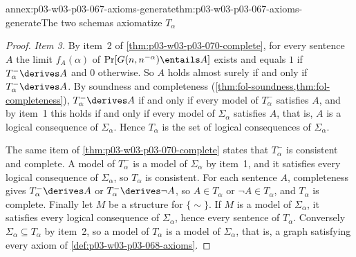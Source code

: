 \begin{annexitem}{annex:p03-w03-p03-067-axioms-generate}{thm:p03-w03-p03-067-axioms-generate}{The two schemas axiomatize \(T_\alpha\)}
\begin{proof}
\emph{Item 3.}  By item~2 of \cref{thm:p03-w03-p03-070-complete}, for every
sentence \(A\) the limit \(f_A(\alpha)\) of
\(\Pr[G(n,n^{-\alpha})\entails A]\) exists and equals \(1\) if
\(T^-_\alpha\derives A\) and \(0\) otherwise.  So \(A\) holds almost surely
if and only if \(T^-_\alpha\derives A\).  By soundness and completeness
(\cref{thm:fol-soundness,thm:fol-completeness}), \(T^-_\alpha\derives A\) if
and only if every model of \(T^-_\alpha\) satisfies \(A\), and by item~1 this
holds if and only if every model of \(\Sigma_\alpha\) satisfies \(A\), that
is, \(A\) is a logical consequence of \(\Sigma_\alpha\).  Hence \(T_\alpha\)
is the set of logical consequences of \(\Sigma_\alpha\).

The same item of \cref{thm:p03-w03-p03-070-complete} states that
\(T^-_\alpha\) is consistent and complete.  A model of \(T^-_\alpha\) is a
model of \(\Sigma_\alpha\) by item~1, and it satisfies every logical
consequence of \(\Sigma_\alpha\), so \(T_\alpha\) is consistent.  For each
sentence \(A\), completeness gives \(T^-_\alpha\derives A\) or
\(T^-_\alpha\derives\neg A\), so \(A\in T_\alpha\) or \(\neg A\in T_\alpha\),
and \(T_\alpha\) is complete.  Finally let \(M\) be a structure for
\(\{\sim\}\).  If \(M\) is a model of \(\Sigma_\alpha\), it satisfies every
logical consequence of \(\Sigma_\alpha\), hence every sentence of
\(T_\alpha\).  Conversely \(\Sigma_\alpha\subseteq T_\alpha\) by item~2, so
a model of \(T_\alpha\) is a model of \(\Sigma_\alpha\), that is, a graph
satisfying every axiom of \cref{def:p03-w03-p03-068-axioms}.
\end{proof}
\end{annexitem}

